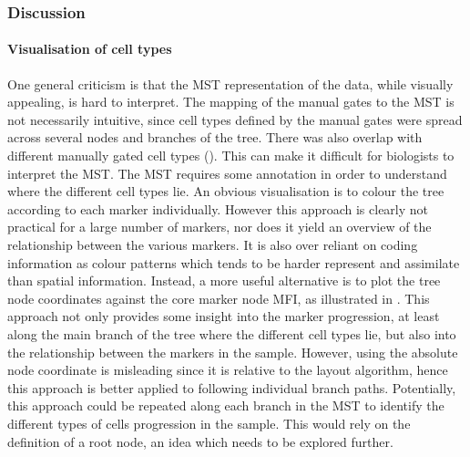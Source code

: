 \clearpage

\subsubsection{Discussion}


\paragraph{Visualisation of cell types}
% 
One general criticism is that the \gls{MST} representation of the data, while visually appealing, is hard to interpret.
The mapping of the manual gates to the MST is not necessarily intuitive,
since cell types defined by the manual gates were spread across several nodes and branches of the tree.
There was also overlap with different manually gated cell types ().
This can make it difficult for biologists to interpret the \gls{MST}.  
The \gls{MST} requires some annotation in order to understand where the different cell types lie.
An obvious visualisation is to colour the tree according to each marker individually.
However this approach is clearly not practical for a large number of markers, nor does it yield an overview of the relationship between
the various markers. It is also over reliant on coding information as colour patterns which tends to be harder represent and assimilate than spatial information.
Instead, a more useful alternative is to plot the tree node coordinates against the core marker node MFI, as illustrated in
.
This approach not only provides some insight into the marker progression, at least along the main branch of the tree where the different cell types lie,
but also into the relationship between the markers in the sample.
However, using the absolute node coordinate is misleading since it is relative to the layout algorithm,
hence this approach is better applied to following individual branch paths.
Potentially, this approach could be repeated along each branch in the \gls{MST} to identify the different types of cells progression in the sample.
This would rely on the definition of a root node, an idea which needs to be explored further.

